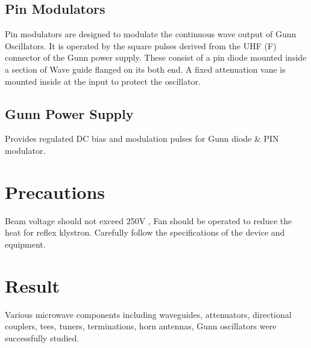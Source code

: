 \documentclass[11pt, a4paper]{article}
\begin{document}
\subsection{Pin Modulators}
Pin modulators are designed to modulate the continuous wave output of Gunn Oscillators. It is operated by the
square pulses derived from the UHF (F) connector of the Gunn power supply. These consist of a pin diode
mounted inside a section of Wave guide flanged on its both end. A fixed attenuation vane is mounted inside at
the input to protect the oscillator.
\subsection{Gunn Power Supply}
Provides regulated DC bias and modulation pulses for Gunn diode \& PIN modulator.
\vspace*{.5cm}
\section*{Precautions}
Beam voltage should not exceed 250V , Fan should be operated to reduce the heat for reflex
klystron. Carefully follow the specifications of the device and equipment.
\vspace*{.5cm}
\section*{Result}
Various microwave components including waveguides, attenuators, directional couplers, tees, tuners,
terminations,
 horn
 antennas,
 Gunn
 oscillators
 were
 successfully
 studied.
\end{document}

